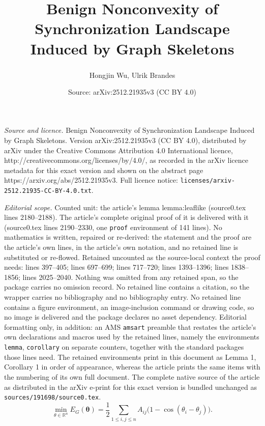 \documentclass[10pt,a4paper]{amsart}
\title{Benign Nonconvexity of Synchronization Landscape Induced by Graph Skeletons}
\author{Hongjin Wu\textsuperscript{\normalfont *}, Ulrik Brandes\textsuperscript{\normalfont\textdagger}}
\date{Source: arXiv:2512.21935v3 (CC BY 4.0)}
\begin{document}
\maketitle

\noindent\emph{Source and licence.} Benign Nonconvexity of Synchronization Landscape Induced by Graph Skeletons. Version arXiv:2512.21935v3 (CC BY 4.0), distributed by arXiv under the Creative Commons Attribution 4.0 International licence, http://creativecommons.org/licenses/by/4.0/, as recorded in the arXiv licence metadata for this exact version and shown on the abstract page https://arxiv.org/abs/2512.21935v3. Full licence notice: \texttt{licenses/arxiv-2512.21935-CC-BY-4.0.txt}.\par\smallskip

\noindent\textit{Editorial scope.} Counted unit: the article's lemma lemma:leaflike (source0.tex lines 2180--2188). The article's complete original proof of it is delivered with it (source0.tex lines 2190--2330, one \texttt{proof} environment of 141 lines). No mathematics is written, repaired or re-derived: the statement and the proof are the article's own lines, in the article's own notation, and no retained line is substituted or re-flowed.  Retained uncounted as the source-local context the proof needs: lines 397--405; lines 697--699; lines 717--720; lines 1393--1396; lines 1838--1856; lines 2025--2040.  Nothing was omitted from any retained span, so the package carries no omission record.  No retained line contains a citation, so the wrapper carries no bibliography and no bibliography entry.  No retained line contains a figure environment, an image-inclusion command or drawing code, so no image is delivered and the package declares no asset dependency.  Editorial formatting only, in addition: an AMS \texttt{amsart} preamble that restates the article's own declarations and macros used by the retained lines, namely the environments \texttt{lemma}, \texttt{corollary} on separate counters, together with the standard packages those lines need.  The retained environments print in this document as Lemma 1, Corollary 1 in order of appearance, whereas the article prints the same items with the numbering of its own full document.  The complete native source of the article as distributed in the arXiv e-print for this exact version is bundled unchanged as \texttt{sources/191698/source0.tex}.
\begin{equation}\label{E_2}
\min_{\theta
\in\mathbb{R}^n}
E_G(\boldsymbol\theta)
=
\frac{1}{2}
\sum_{1\le i,j\le n}
A_{ij}\bigl(1-\cos(\theta_i-\theta_j)\bigr).
\end{equation}
\end{document}
